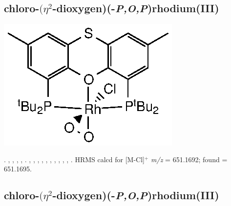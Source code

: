 
\subsection*{chloro-$(\eta^2$-dioxygen)(\tButhixantphosk-\emph{P,O,P})rhodium(III)}

\begin{structure}[h]
\begin{center}
\includegraphics{../Structures/StBuRhClO2.eps}
\end{center}
\end{structure}

.
,
,
,
,
.
,
,
,
,
,
,
,
,
,
,
.
HRMS calcd for  [M-Cl]$^+$ \emph{m/z} = 651.1692; found = 651.1695.




\subsection*{chloro-$(\eta^2$-dioxygen)(\tBuxantphosk-\emph{P,O,P})rhodium(III)}

